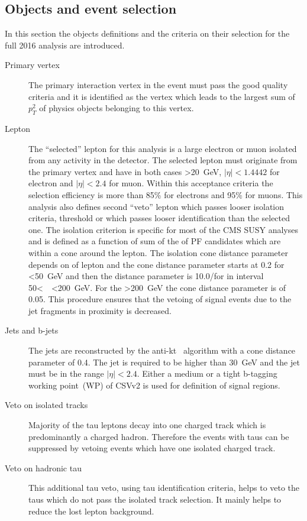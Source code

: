 
\subsection{Objects and event selection~\label{sec:objects}}


In this section the objects definitions and the criteria on their selection for the full 2016 analysis are introduced.

\begin{description}
\item[Primary vertex]
The primary interaction vertex in the event must pass the good quality criteria and it is identified as the vertex which leads to the largest sum of $p_{T}^{2}$ of physics objects belonging to this vertex.

\item[Lepton]
The ``selected'' lepton for this analysis is a large \pt electron or muon isolated from any activity in the detector. The selected lepton must originate from the primary vertex and have in both cases \pt>20~GeV, $|\eta|<1.4442$ for electron and $|\eta|<2.4$ for muon. Within this acceptance criteria the selection efficiency is more than 85\% for electrons and 95\% for muons. This analysis also defines second ``veto'' lepton which passes looser isolation criteria, \pt threshold or which passes looser identification than the selected one. The isolation criterion is specific for most of the CMS SUSY analyses and is defined as a function of sum of the \pt of PF candidates which are within a cone around the lepton. The isolation cone distance parameter depends on \pt of lepton and the cone distance parameter  starts at 0.2 for \pt<50~GeV and then the distance parameter is 10.0/\pt for \pt in interval 50<~\pt~<200~GeV. For the \pt>200~GeV the cone distance parameter is of 0.05. This procedure ensures that the vetoing of signal events due to the jet fragments in proximity is decreased.   

\item[Jets and b-jets]
The jets are reconstructed by the anti-kt~\cite{Cacciari:2008gp} algorithm with a cone distance parameter of 0.4. The jet \pt is required to be higher than 30~GeV and the jet must be in the range $|\eta|<2.4$. Either a medium or a tight b-tagging working point~(WP) of CSVv2 is used for definition of signal regions.  

\item[Veto on isolated tracks]
Majority of the tau leptons decay into one charged track which is predominantly a charged hadron. Therefore the events with taus can be suppressed by vetoing events which have one isolated charged track.

\item[Veto on hadronic tau]
This additional tau veto, using tau identification criteria, helps to veto the taus which do not pass the isolated track selection. It mainly helps to reduce the lost lepton background.
\end{description}

